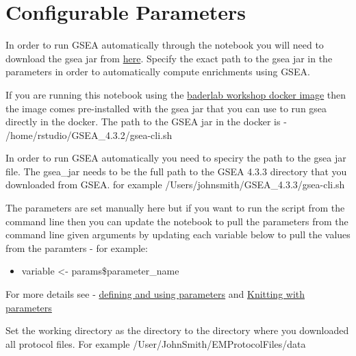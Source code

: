 \documentclass[
]{book}
\newenvironment{Shaded}{\begin{snugshade}}{\end{snugshade}}
\newcommand{\CommentTok}[1]{\textcolor[rgb]{0.56,0.35,0.01}{\textit{#1}}}
\newcommand{\NormalTok}[1]{#1}
\newcommand{\OtherTok}[1]{\textcolor[rgb]{0.56,0.35,0.01}{#1}}
\newcommand{\SpecialCharTok}[1]{\textcolor[rgb]{0.81,0.36,0.00}{\textbf{#1}}}
\providecommand{\tightlist}{%
  \setlength{\itemsep}{0pt}\setlength{\parskip}{0pt}}
\begin{document}
\section{Configurable Parameters}\label{configurable-parameters}

In order to run GSEA automatically through the notebook you will need to download the gsea jar from \href{http://software.broadinstitute.org/gsea/downloads.jsp}{here}. Specify the exact path to the gsea jar in the parameters in order to automatically compute enrichments using GSEA.

If you are running this notebook using the \href{https://hub.docker.com/r/risserlin/workshop_base_image}{baderlab workshop docker image} then the image comes pre-installed with the gsea jar that you can use to run gsea directly in the docker. The path to the GSEA jar in the docker is - /home/rstudio/GSEA\_4.3.2/gsea-cli.sh

In order to run GSEA automatically you need to speciry the path to the gsea jar file.
The gsea\_jar needs to be the full path to the GSEA 4.3.3 directory that you downloaded from GSEA. for example /Users/johnsmith/GSEA\_4.3.3/gsea-cli.sh

The parameters are set manually here but if you want to run the script from the command line then you can update the notebook to pull the parameters from the command line given arguments by updating each variable below to pull the values from the paramters - for example:

\begin{itemize}
\tightlist
\item
  variable \textless- params\$parameter\_name
\end{itemize}

For more details see - \href{https://bookdown.org/yihui/rmarkdown/params-declare.html}{defining and using parameters} and \href{https://bookdown.org/yihui/rmarkdown/params-knit.html}{Knitting with parameters}

\begin{Shaded}
\end{Shaded}

Set the working directory as the directory to the directory where you downloaded all protocol files. For example /User/JohnSmith/EMProtocolFiles/data
\end{document}
